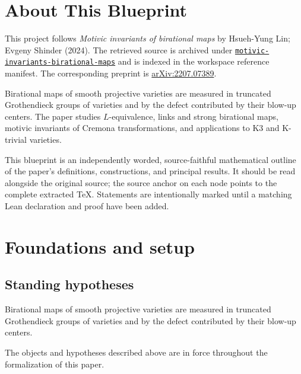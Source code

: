 

\chapter*{About This Blueprint}
\label{motivic-invariants-birational-maps-about}

This project follows \emph{Motivic invariants of birational maps} by Hsueh-Yung Lin; Evgeny Shinder (2024). The
retrieved source is archived under
\href{../../../../../references/motivic-invariants-birational-maps/}{\texttt{motivic-invariants-birational-maps}} and is indexed in
the workspace reference manifest. The corresponding preprint is
\href{https://arxiv.org/abs/2207.07389}{arXiv:2207.07389}.

Birational maps of smooth projective varieties are measured in truncated Grothendieck groups of varieties and by the defect contributed by their blow-up centers. The paper studies $L$-equivalence, links and strong birational maps, motivic invariants of Cremona transformations, and applications to K3 and K-trivial varieties.

This blueprint is an independently worded, source-faithful mathematical
outline of the paper's definitions, constructions, and principal results. It
should be read alongside the original source; the source anchor on each node
points to the complete extracted TeX. Statements are intentionally marked
\notready until a matching Lean declaration and proof have been added.

\chapter{Foundations and setup}
\label{chap:motivic-invariants-birational-maps-foundations}

\section{Standing hypotheses}
\label{sec:motivic-invariants-birational-maps-standing}

Birational maps of smooth projective varieties are measured in truncated Grothendieck groups of varieties and by the defect contributed by their blow-up centers.

\begin{convention}
\label{motivic-invariants-birational-maps-setup}
The objects and hypotheses described above are in force throughout the
formalization of this paper.
\notready
\end{convention}

